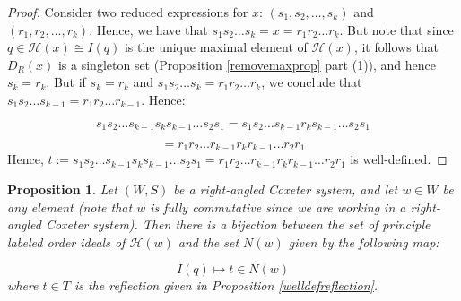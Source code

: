 \documentclass{amsart}
\theoremstyle{plain} %
\newtheorem{prop}[thm]{Proposition}
\theoremstyle{definition}
\def\H#1{\mathcal{H}(#1)}
\begin{document}
\begin{proof}
    Consider two reduced expressions for $ x$: $ (s_{1},s_{2}, \dots, s_{k})$ and $ (r_{1}, r_{2}, \dots , r_{k})$. Hence, we have that $ s_{1}s_{2}\dots s_{k} = x = r_{1}r_{2} \dots r_{k}$. But note that since $ q \in \H{x} \cong I(q)$ is the unique maximal element of $ \H{x}$, it follows that $ D_{R}(x)$ is a singleton set (Proposition \ref{removemaxprop} part (1)), and hence $ s_{k} = r_{k}$. But if $ s_{k} = r_{k}$ and $ s_{1}s_{2}\dots s_{k} = r_{1}r_{2} \dots r_{k}$, we conclude that $ s_{1}s_{2}\dots s_{k-1} = r_{1}r_{2} \dots r_{k-1}$. Hence:

    $$ s_{1}s_{2} \dots s_{k-1}s_{k}s_{k-1} \dots s_{2}s_{1} = s_{1}s_{2} \dots s_{k-1}r_{k}s_{k-1} \dots s_{2}s_{1}$$

    $$ = r_{1}r_{2} \dots r_{k-1}r_{k}r_{k-1}\dots r_{2}r_{1}$$
    Hence, $ t := s_{1}s_{2} \dots s_{k-1}s_{k}s_{k-1}\dots s_{2}s_{1} =  r_{1}r_{2} \dots r_{k-1}r_{k}r_{k-1}\dots r_{2}r_{1}$ is well-defined.
\end{proof}


\begin{prop} \label{racsreflbijection}
    Let $ (W,S)$ be a right-angled Coxeter system, and let $ w\in W$ be any element (note that $ w$ is fully commutative since we are working in a right-angled Coxeter system). Then there is a bijection between the set of principle labeled order ideals of $ \H{w}$ and the set $ N(w)$ given by the following map:

    $$ I(q) \longmapsto t \in N(w) $$
    where $ t\in T$ is the reflection given in Proposition \ref{welldefreflection}.
\end{prop}
\end{document}
